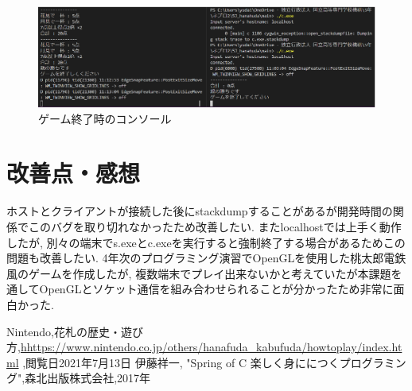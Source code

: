 \documentclass[a4j]{jarticle}
\begin{document}
    \begin{figure}[H]
    \centering
    \includegraphics[scale=1.0]{./img/game_end.eps}
    \caption{ゲーム終了時のコンソール}
    \label{gameendconsole}
    \end{figure}

    \section{改善点・感想}
    ホストとクライアントが接続した後にstackdumpすることがあるが開発時間の関係でこのバグを取り切れなかったため改善したい. またlocalhostでは上手く動作したが, 
    別々の端末でs.exeとc.exeを実行すると強制終了する場合があるためこの問題も改善したい. 4年次のプログラミング演習でOpenGLを使用した桃太郎電鉄風のゲームを作成したが, 
    複数端末でプレイ出来ないかと考えていたが本課題を通してOpenGLとソケット通信を組み合わせられることが分かったため非常に面白かった. 

        \begin{thebibliography}{9}
            Nintendo,花札の歴史・遊び方,\url{hhttps://www.nintendo.co.jp/others/hanafuda_kabufuda/howtoplay/index.html} ,閲覧日2021年7月13日
            伊藤祥一, "Spring of C 楽しく身ににつくプログラミング",森北出版株式会社,2017年
        \end{thebibliography}
\end{document}
